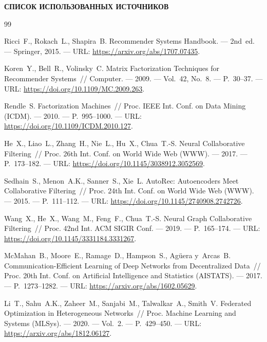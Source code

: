 \documentclass[14pt,a4paper]{extarticle}
\newcommand{\structsection}[1]{%
  \clearpage
  \phantomsection
  {\centering\bfseries\fontsize{14}{16}\selectfont #1\par}
  \vspace{0.5em}%
}
\begin{document}
\newpage


\structsection{СПИСОК ИСПОЛЬЗОВАННЫХ ИСТОЧНИКОВ}

\renewcommand{\refname}{}
\begin{thebibliography}{99}
\vspace{-2em}

Ricci~F., Rokach~L., Shapira~B.
Recommender Systems Handbook.
--- 2nd~ed. --- Springer, 2015. --- URL: \url{https://arxiv.org/abs/1707.07435}.

Koren~Y., Bell~R., Volinsky~C.
Matrix Factorization Techniques for Recommender Systems~//
Computer. --- 2009. --- Vol.~42, No.~8. --- P.~30--37. --- URL: \url{https://doi.org/10.1109/MC.2009.263}.

Rendle~S.
Factorization Machines~//
Proc. IEEE Int. Conf. on Data Mining (ICDM). --- 2010. --- P.~995--1000. --- URL: \url{https://doi.org/10.1109/ICDM.2010.127}.

He~X., Liao~L., Zhang~H., Nie~L., Hu~X., Chua~T.-S.
Neural Collaborative Filtering~//
Proc. 26th Int. Conf. on World Wide Web (WWW). --- 2017. --- P.~173--182. --- URL: \url{https://doi.org/10.1145/3038912.3052569}.

Sedhain~S., Menon~A.K., Sanner~S., Xie~L.
AutoRec: Autoencoders Meet Collaborative Filtering~//
Proc. 24th Int. Conf. on World Wide Web (WWW). --- 2015. --- P.~111--112. --- URL: \url{https://doi.org/10.1145/2740908.2742726}.

Wang~X., He~X., Wang~M., Feng~F., Chua~T.-S.
Neural Graph Collaborative Filtering~//
Proc. 42nd Int. ACM SIGIR Conf. --- 2019. --- P.~165--174. --- URL: \url{https://doi.org/10.1145/3331184.3331267}.

McMahan~B., Moore~E., Ramage~D., Hampson~S., Ag\"uera y~Arcas~B.
Communication-Efficient Learning of Deep Networks from Decentralized Data~//
Proc. 20th Int. Conf. on Artificial Intelligence and Statistics (AISTATS). --- 2017. --- P.~1273--1282. --- URL: \url{https://arxiv.org/abs/1602.05629}.

Li~T., Sahu~A.K., Zaheer~M., Sanjabi~M., Talwalkar~A., Smith~V.
Federated Optimization in Heterogeneous Networks~//
Proc. Machine Learning and Systems (MLSys). --- 2020. --- Vol.~2. --- P.~429--450. --- URL: \url{https://arxiv.org/abs/1812.06127}.


\end{thebibliography}
\end{document}
